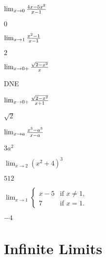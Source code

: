 \begin{exercises}
\begin{exercise} $\lim _{x\to 0 } {4x - 5x^2\over x-1}$
\begin{answer} $0$
\end{answer}\end{exercise}

\begin{exercise} $\lim _{x\to 1 } {x^2 -1 \over x-1 }$
\begin{answer} $2$
\end{answer}\end{exercise}

\begin{exercise} $\lim _{x\to 0 + } {\sqrt{2-x^2 }\over x}$
\begin{answer} DNE
\end{answer}\end{exercise}

\begin{exercise} $\lim _{x\to 0 + } {\sqrt{2-x^2}\over x+1}$
\begin{answer} $\sqrt2$
\end{answer}\end{exercise}

\begin{exercise} $\lim _{x\to a } {x^3 -a^3\over x-a}$
\begin{answer} $3a^2$
\end{answer}\end{exercise}

\begin{exercise} $\lim _{x\to 2 } (x^2 +4)^3$
\begin{answer} $512$
\end{answer}\end{exercise}

\begin{exercise} $\lim _{x\to 1 } \begin{cases}
x-5 & \text{if $x\ne 1$}, \\
7 & \text{if $x=1$}. \end{cases}$
\begin{answer} $-4$
\end{answer}\end{exercise}

\endtwocol

\end{exercises}






\section{Infinite Limits}


